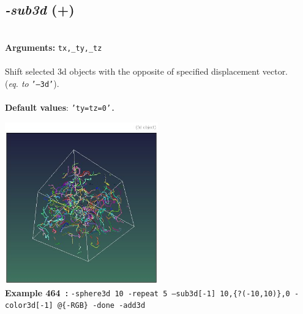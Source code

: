 \documentclass[a4paper,11pt,twoside]{book}
\begin{document}
\subsection{\emph{-sub3d} (+)}\vspace*{-0.5em}
~\\\textbf{Arguments: } 
{\small \texttt{tx,\_ty,\_tz}}\\~\\
Shift selected 3d objects with the opposite of specified displacement vector.
~\\(\emph{eq. to} {\small \texttt{'--3d'}}).
~\\~\\\textbf{Default values}: {\small \texttt{'ty=tz=0'.}}
\begin{center}\includegraphics[keepaspectratio=true,height=7cm,width=\textwidth]{img/gmic_def464.jpg}\\
{\footnotesize \textbf{Example 464~:} \texttt{-sphere3d 10 -repeat 5 --sub3d[-1] 10,\{?(-10,10)\},0 -color3d[-1] @\{-RGB\} -done -add3d}}
\end{center}
\end{document}
